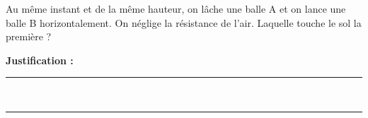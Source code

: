 Au même instant et de la même hauteur, on lâche une balle A et on lance une balle B horizontalement. On néglige la résistance de l'air. Laquelle touche le sol la première ?

\choices

\noindent\textbf{Justification :} \hrulefill \\[2.5ex]
\rule{\linewidth}{0.4pt} \\[2.5ex]
\rule{\linewidth}{0.4pt}
\vfill
